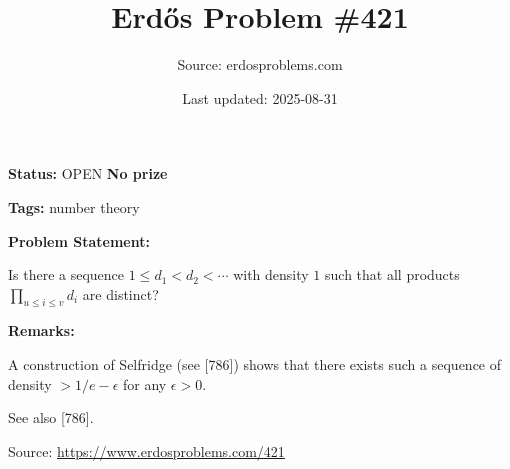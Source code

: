 \documentclass{article}
\title{Erd\H{o}s Problem \#421}
\date{Last updated: 2025-08-31}
\author{Source: erdosproblems.com}
\begin{document}
\maketitle

\noindent\textbf{Status:} OPEN \quad \textbf{No prize}

\noindent\textbf{Tags:} number theory

\medskip
\noindent\textbf{Problem Statement:}

Is there a sequence $1\leq d_1<d_2<\cdots$ with density $1$ such that all products $\prod_{u\leq i\leq v}d_i$ are distinct?

\bigskip
\noindent\textbf{Remarks:}

A construction of Selfridge (see [786]) shows that there exists such a sequence of density $>1/e-\epsilon$ for any $\epsilon>0$.

See also [786].

\bigskip
\noindent\small{Source: \url{https://www.erdosproblems.com/421}}
\end{document}
